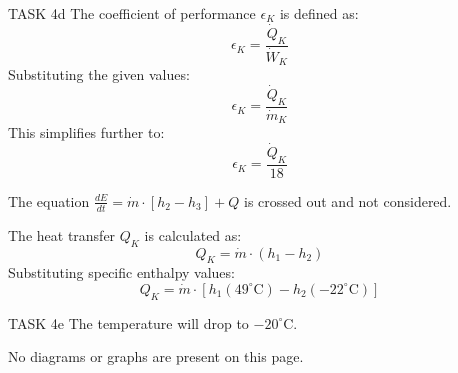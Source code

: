 TASK 4d  
The coefficient of performance \( \epsilon_K \) is defined as:  
\[
\epsilon_K = \frac{\dot{Q}_K}{\dot{W}_K}
\]  
Substituting the given values:  
\[
\epsilon_K = \frac{\dot{Q}_K}{\dot{m}_K}
\]  
This simplifies further to:  
\[
\epsilon_K = \frac{\dot{Q}_K}{18}
\]  

The equation \( \frac{dE}{dt} = \dot{m} \cdot [h_2 - h_3] + Q \) is crossed out and not considered.  

The heat transfer \( Q_K \) is calculated as:  
\[
Q_K = \dot{m} \cdot (h_1 - h_2)
\]  
Substituting specific enthalpy values:  
\[
Q_K = \dot{m} \cdot \left[ h_1(49^\circ\text{C}) - h_2(-22^\circ\text{C}) \right]
\]  

TASK 4e  
The temperature will drop to \( -20^\circ\text{C} \).  

No diagrams or graphs are present on this page.